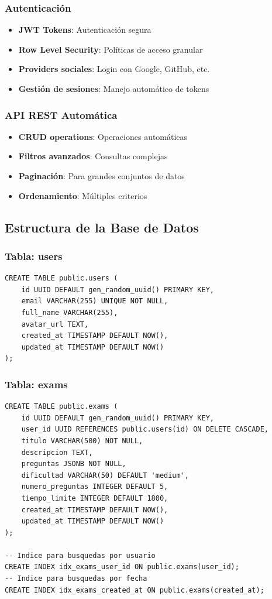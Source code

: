 \documentclass[12pt,a4paper]{report}
\begin{document}
\subsubsection{Autenticación}
\begin{itemize}
    \item \textbf{JWT Tokens}: Autenticación segura
    \item \textbf{Row Level Security}: Políticas de acceso granular
    \item \textbf{Providers sociales}: Login con Google, GitHub, etc.
    \item \textbf{Gestión de sesiones}: Manejo automático de tokens
\end{itemize}

\subsubsection{API REST Automática}
\begin{itemize}
    \item \textbf{CRUD operations}: Operaciones automáticas
    \item \textbf{Filtros avanzados}: Consultas complejas
    \item \textbf{Paginación}: Para grandes conjuntos de datos
    \item \textbf{Ordenamiento}: Múltiples criterios
\end{itemize}

\subsection{Estructura de la Base de Datos}

\subsubsection{Tabla: users}
\begin{lstlisting}
CREATE TABLE public.users (
    id UUID DEFAULT gen_random_uuid() PRIMARY KEY,
    email VARCHAR(255) UNIQUE NOT NULL,
    full_name VARCHAR(255),
    avatar_url TEXT,
    created_at TIMESTAMP DEFAULT NOW(),
    updated_at TIMESTAMP DEFAULT NOW()
);
\end{lstlisting}

\subsubsection{Tabla: exams}
\begin{lstlisting}
CREATE TABLE public.exams (
    id UUID DEFAULT gen_random_uuid() PRIMARY KEY,
    user_id UUID REFERENCES public.users(id) ON DELETE CASCADE,
    titulo VARCHAR(500) NOT NULL,
    descripcion TEXT,
    preguntas JSONB NOT NULL,
    dificultad VARCHAR(50) DEFAULT 'medium',
    numero_preguntas INTEGER DEFAULT 5,
    tiempo_limite INTEGER DEFAULT 1800,
    created_at TIMESTAMP DEFAULT NOW(),
    updated_at TIMESTAMP DEFAULT NOW()
);

-- Indice para busquedas por usuario
CREATE INDEX idx_exams_user_id ON public.exams(user_id);
-- Indice para busquedas por fecha
CREATE INDEX idx_exams_created_at ON public.exams(created_at);
\end{lstlisting}
\end{document}
